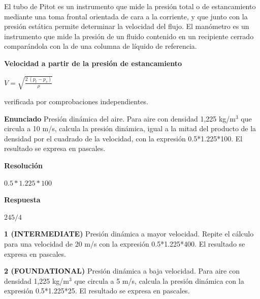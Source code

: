 \documentclass{book}
\begin{document}
\begin{tcolorbox}[title={Definición}, studiumdef, breakable]

El tubo de Pitot es un instrumento que mide la presión total o de estancamiento mediante una toma frontal orientada de cara a la corriente, y que junto con la presión estática permite determinar la velocidad del flujo. El manómetro es un instrumento que mide la presión de un fluido contenido en un recipiente cerrado comparándola con la de una columna de líquido de referencia.
\end{tcolorbox}

\begin{tcolorbox}[title={Derivaciones}, studiumdef, breakable]

\noindent\textbf{Velocidad a partir de la presión de estancamiento}

\(V = \sqrt{\frac{2\,(p_t - p_s)}{\rho}}\)

\noindent\footnotesize verificada por comprobaciones independientes.
\end{tcolorbox}

\begin{tcolorbox}[title={Problema resuelto}, studiumworked, breakable]

\noindent\textbf{Enunciado}
Presión dinámica del aire. Para aire con densidad 1,225 kg/m\(^{3}\) que circula a 10 m/s, calcula la presión dinámica, igual a la mitad del producto de la densidad por el cuadrado de la velocidad, con la expresión 0.5*1.225*100. El resultado se expresa en pascales.

\noindent\textbf{Resolución}

\(0.5*1.225*100\)

\noindent\textbf{Respuesta}

\(245/4\)
\end{tcolorbox}

\begin{tcolorbox}[title={Ejercicios}, studiumworked, breakable]

\noindent\textbf{1 (INTERMEDIATE)}
Presión dinámica a mayor velocidad. Repite el cálculo para una velocidad de 20 m/s con la expresión 0.5*1.225*400. El resultado se expresa en pascales.

\noindent\textbf{2 (FOUNDATIONAL)}
Presión dinámica a baja velocidad. Para aire con densidad 1,225 kg/m\(^{3}\) que circula a 5 m/s, calcula la presión dinámica con la expresión 0.5*1.225*25. El resultado se expresa en pascales.
\end{tcolorbox}
\end{document}
